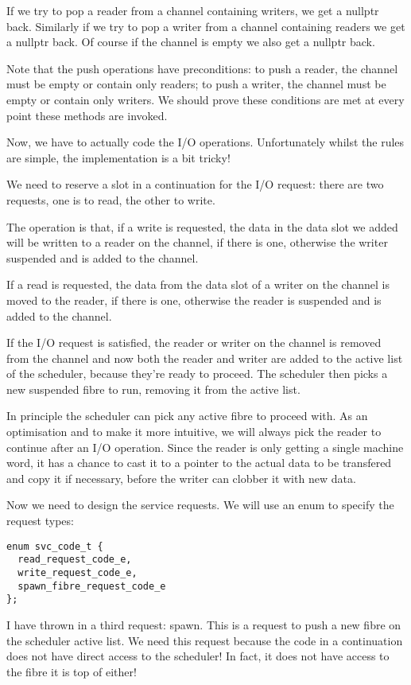 \documentclass[oneside]{book}
\begin{document}
If we try to pop a reader from a channel containing writers, we get 
a nullptr back. Similarly if we try to pop a writer from a channel
containing readers we get a nullptr back. Of course if the channel
is empty we also get a nullptr back.

Note that the push operations have preconditions: to push a reader,
the channel must be empty or contain only readers; to push a writer,
the channel must be empty or contain only writers. We should prove these
conditions are met at every point these methods are invoked.


Now, we have to actually code the I/O operations. Unfortunately
whilst the rules are simple, the implementation is a bit tricky!

We need to reserve a slot in a continuation for the I/O request:
there are two requests, one is to read, the other to write.

The operation is that, if a write is requested, the data in the data slot
we added will be written to a reader on the channel, if there is one,
otherwise the writer suspended and is added to the channel. 

If a read is requested, the data from the data slot of a writer on
the channel is moved to the reader, if there is one, otherwise
the reader is suspended and is added to the channel.

If the I/O request is satisfied, the reader or writer on the channel
is removed from the channel and now both the reader and writer are
added to the active list of the scheduler, because they're ready to
proceed. The scheduler then picks a new suspended fibre to run,
removing it from the active list.

In principle the scheduler can pick any active fibre to proceed with.
As an optimisation and to make it more intuitive, we will always
pick the reader to continue after an I/O operation. Since the reader
is only getting a single machine word, it has a chance to cast it to
a pointer to the actual data to be transfered and copy it if necessary,
before the writer can clobber it with new data.

Now we need to design the service requests. We will use an enum
to specify the request types:

\begin{verbatim}
enum svc_code_t {
  read_request_code_e,
  write_request_code_e,
  spawn_fibre_request_code_e
};
\end{verbatim}

I have thrown in a third request: spawn. This is a request to push a new
fibre on the scheduler active list. We need this request because the code
in a continuation does not have direct access to the scheduler! In fact,
it does not have access to the fibre it is top of either!
\end{document}
